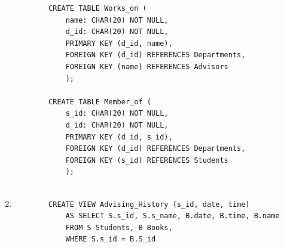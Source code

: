 \begin{enumerate}[label = {(\alph*)}]
\begin{verbatim}
        CREATE TABLE Works_on (
            name: CHAR(20) NOT NULL,
            d_id: CHAR(20) NOT NULL,
            PRIMARY KEY (d_id, name),
            FOREIGN KEY (d_id) REFERENCES Departments,
            FOREIGN KEY (name) REFERENCES Advisors
            );
            
        CREATE TABLE Member_of (
            s_id: CHAR(20) NOT NULL,
            d_id: CHAR(20) NOT NULL,
            PRIMARY KEY (d_id, s_id),
            FOREIGN KEY (d_id) REFERENCES Departments,
            FOREIGN KEY (s_id) REFERENCES Students
            );
            
    \end{verbatim}
    
    \item
    \begin{verbatim}
        CREATE VIEW Advising_History (s_id, date, time)
            AS SELECT S.s_id, S.s_name, B.date, B.time, B.name
            FROM S Students, B Books,
            WHERE S.s_id = B.S_id
    \end{verbatim}
\end{enumerate}